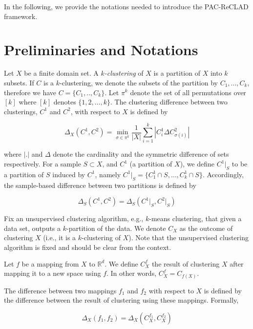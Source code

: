 \documentclass[letterpaper,12pt,titlepage,oneside,final]{book}
\begin{document}
In the following, we provide the notations needed to introduce the PAC-ReCLAD framework.


\section{Preliminaries and Notations}

Let $X$ be a finite domain set. A \textit{$k$-clustering} of $X$ is a partition of $X$ into $k$ subsets. If $C$ is a $k$-clustering, we denote the subsets of the partition by $C_1,...,C_k$, therefore we have $C=\{C_1,..,C_k\}$. Let $\pi^k$ denote the set of all permutations over $[k]$ where $[k]$ denotes $\{1,2,...,k\}$. The clustering difference between two clusterings, $C^1$ and $C^2$, with respect to $X$ is defined by

\begin{equation}
\Delta_{X}(C^1, C^2) = \min_{\sigma \in \pi^k } \frac{1}{|X|} \sum_{i=1}^{k} |C^1_i \Delta C^2_{\sigma(i)}|
\end{equation}

where $|.|$ and $\Delta$ denote the cardinality and the symmetric difference of sets respectively. For a sample $S\subset X$, and $C^1$ (a partition of $X$), we define $C^1\Big|_S$ to be a partition of $S$ induced by $C^1$, namely $C^1\Big|_S = \{C^1_1\cap S,\ldots,C^1_k\cap S \}$. Accordingly, the sample-based difference between two partitions is defined by

\begin{equation}
\Delta_{S}(C^1, C^2) = \Delta_{S}(C^1\Big|_S, C^2\Big|_S)
\end{equation}

Fix an unsupervised clustering algorithm, e.g., $k$-means clustering, that given a data set, outputs a $k$-partition of the data. We denote $C_{X}$ as the outcome of clustering $X$ (i.e., it is a $k$-clustering of $X$). Note that the unsupervised clustering algorithm is fixed and should be clear from the context.

Let $f$ be a mapping from $X$ to $\mathbb{R}^{d}$. We define $C^f_{X}$ the result of clustering $X$ after mapping it to a new space using $f$. In other words, $C^f_{X} = C_{f(X)}$. 

The difference between two mappings $f_1$ and $f_2$ with respect to $X$ is defined by the difference between the result of clustering using these mappings. Formally,

\begin{equation}
\Delta_{X}(f_1, f_2) = \Delta_{X}(C^{f_1}_{X},  C^{f_2}_{X})
\end{equation}
\end{document}
